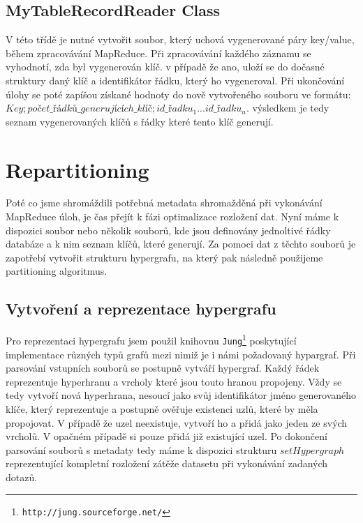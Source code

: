 \documentclass[thesis=M,czech]{FITthesis}[2012/06/26]
\begin{document}
\subsection{MyTableRecordReader Class}
V této třídě je nutné vytvořit soubor, který uchová vygenerované páry key/value, během zpracovávání MapReduce. Při zpracovávání každého záznamu se vyhodnotí, zda byl vygenerován klíč. v případě že ano, uloží se do dočasné struktury daný klíč a identifikátor řádku, který ho vygeneroval. Při ukončování úlohy se poté zapíšou získané hodnoty do nově vytvořeného souboru ve formátu: $Key;počet\_řádků\_generujících\_klíč;id\_řadku_1 ... id\_řadku_n$. výsledkem je tedy seznam vygenerovaných klíčů s řádky které tento klíč generují.


\section{Repartitioning}
Poté co jsme shromáždili potřebná metadata shromažděná při vykonávání MapReduce úloh, je čas přejít k fázi optimalizace rozložení dat. Nyní máme k dispozici soubor nebo několik souborů, kde jsou definovány jednoltivé řádky databáze a k nim seznam klíčů, které generují. Za pomoci dat z těchto souborů je zapotřebí vytvořit strukturu hypergrafu, na který pak následně použijeme partitioning algoritmus.

\subsection{Vytvoření a reprezentace hypergrafu}
Pro reprezentaci hypergrafu jsem použil knihovnu \texttt{Jung}\footnote{\texttt{http://jung.sourceforge.net/}} poskytující implementace různých typů grafů mezi nimiž je i námi požadovaný hypargraf. Při parsování vstupních souborů se postupně vytváří hypergraf.  Každý řádek reprezentuje hyperhranu a vrcholy které jsou touto hranou propojeny. Vždy se tedy vytvoří nová hyperhrana, nesoucí jako svůj identifikátor jméno generovaného klíče, který reprezentuje a postupně ověřuje existenci uzlů, které by měla propojovat. V případě že uzel neexistuje, vytvoří ho a přidá jako jeden ze svých vrcholů. V opačném případě si pouze přidá již existující uzel. Po dokončení parsování souborů s metadaty tedy máme k dispozici strukturu $setHypergraph$ reprezentující kompletní rozložení zátěže datasetu při vykonávání zadaných dotazů.
\end{document}
